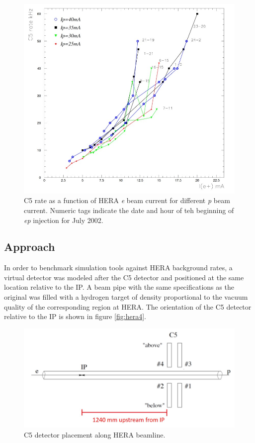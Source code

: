 \begin{figure}
	\centering
	\includegraphics[width=.75\textwidth]{../../img/hera_c5_rate.jpg}
	\caption{C5 rate as a function of HERA \textit{e} beam current for different \textit{p} beam current.  Numeric tags indicate the date and hour of teh beginning of \textit{ep} injection for July 2002.}
	\label{fig:hera3}
\end{figure}


\subsection{Approach}

In order to benchmark simulation tools against HERA background rates, a virtual detector was modeled after the C5 detector and positioned at the same location relative to the IP.  A beam pipe with the same specifications as the original was filled with a hydrogen target of density proportional to the vacuum quality of the corresponding region at HERA.  The orientation of the C5 detector relative to the IP is shown in figure \ref{fig:hera4}.  

\begin{figure}
	\centering
	\includegraphics[width=.75\textwidth]{../../img/c5_placement.jpg}
	\caption{C5 detector placement along HERA beamline.}
	\label{fig:hera1}
\end{figure}


